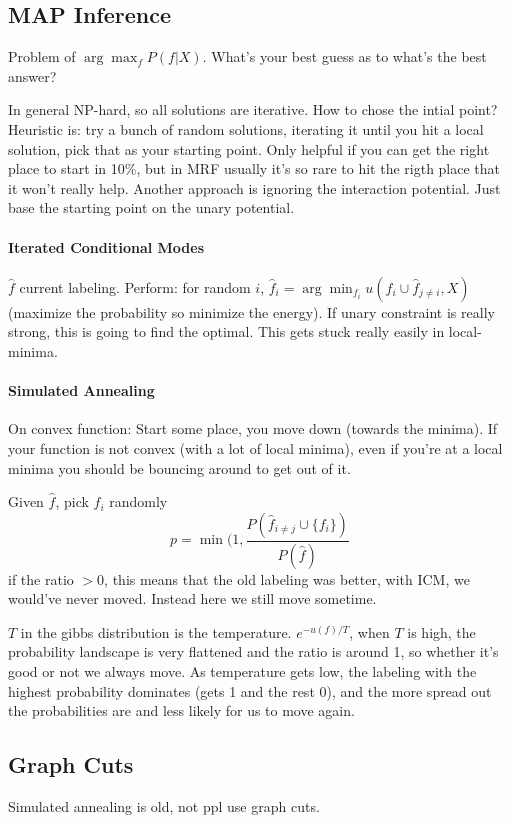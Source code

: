\subsection{MAP Inference}
\label{sec:inference}
Problem of $\arg\max_f P(f | X)$. What's your best guess as to what's
the best answer?

In general NP-hard, so all solutions are iterative. How to chose the
intial point? Heuristic is: try a bunch of random solutions, iterating
it until you hit a local solution, pick that as your starting
point. Only helpful if you can get the right place to start in 10\%,
but in MRF usually it's so rare to hit the rigth place that it won't
really help. Another approach is ignoring the interaction
potential. Just base the starting point on the unary potential.

\paragraph{Iterated Conditional Modes}
$\hat f$ current labeling. Perform:
for random $i$, $\hat f_i = \arg\min_{f_i} u(f_i\cup \hat f_{j\neq i},
X)$ (maximize the probability so minimize the energy). If unary
constraint is really strong, this is going to find the optimal. This
gets stuck really easily in local-minima.

\paragraph{Simulated Annealing}
On convex function: Start some place, you move down (towards the
minima). 
If your function is not convex (with a lot of local minima), even if
you're at a local minima you should be bouncing around to get out of it.

Given $\hat f$, pick $f_i$ randomly $$p = \min(1, \frac{P(\hat f_{i\neq
    j} \cup \{ f_i\}) }{P(\hat f) }$$ if the ratio $> 0$, this means that the old
labeling was better, with ICM, we would've never moved. Instead here
we still move sometime.

$T$ in the gibbs distribution is the temperature. $e^{-u(f)/T}$, when $T$
is high, the probability landscape is very flattened and the ratio is
around 1, so whether it's good or not we always move. As temperature
gets low, the labeling with the highest probability dominates (gets 1 
and the rest 0), and the more spread out the probabilities are and less likely
for us to move again.

\subsection{Graph Cuts}
\label{sec:graph-cuts}
Simulated annealing is old, not ppl use graph cuts.

